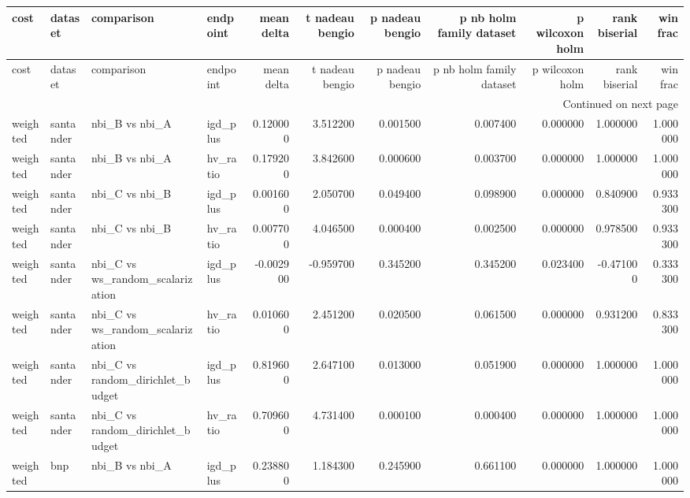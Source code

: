 \begin{landscape}
\begin{center}\label{tab:s5tests}\end{center}
\begingroup\tiny\setlength{\tabcolsep}{2.5pt}
\begin{longtable}{llllrrrrrrr}
\toprule
cost & dataset & comparison & endpoint & mean delta & t nadeau bengio & p nadeau bengio & p nb holm family dataset & p wilcoxon holm & rank biserial & win frac \\
\midrule
\endfirsthead
\toprule
cost & dataset & comparison & endpoint & mean delta & t nadeau bengio & p nadeau bengio & p nb holm family dataset & p wilcoxon holm & rank biserial & win frac \\
\midrule
\endhead
\midrule
\multicolumn{11}{r}{Continued on next page} \\
\midrule
\endfoot
\bottomrule
\endlastfoot
weighted & santander & nbi\_B vs nbi\_A & igd\_plus & 0.120000 & 3.512200 & 0.001500 & 0.007400 & 0.000000 & 1.000000 & 1.000000 \\
weighted & santander & nbi\_B vs nbi\_A & hv\_ratio & 0.179200 & 3.842600 & 0.000600 & 0.003700 & 0.000000 & 1.000000 & 1.000000 \\
weighted & santander & nbi\_C vs nbi\_B & igd\_plus & 0.001600 & 2.050700 & 0.049400 & 0.098900 & 0.000000 & 0.840900 & 0.933300 \\
weighted & santander & nbi\_C vs nbi\_B & hv\_ratio & 0.007700 & 4.046500 & 0.000400 & 0.002500 & 0.000000 & 0.978500 & 0.933300 \\
weighted & santander & nbi\_C vs ws\_random\_scalarization & igd\_plus & -0.002900 & -0.959700 & 0.345200 & 0.345200 & 0.023400 & -0.471000 & 0.333300 \\
weighted & santander & nbi\_C vs ws\_random\_scalarization & hv\_ratio & 0.010600 & 2.451200 & 0.020500 & 0.061500 & 0.000000 & 0.931200 & 0.833300 \\
weighted & santander & nbi\_C vs random\_dirichlet\_budget & igd\_plus & 0.819600 & 2.647100 & 0.013000 & 0.051900 & 0.000000 & 1.000000 & 1.000000 \\
weighted & santander & nbi\_C vs random\_dirichlet\_budget & hv\_ratio & 0.709600 & 4.731400 & 0.000100 & 0.000400 & 0.000000 & 1.000000 & 1.000000 \\
weighted & bnp & nbi\_B vs nbi\_A & igd\_plus & 0.238800 & 1.184300 & 0.245900 & 0.661100 & 0.000000 & 1.000000 & 1.000000 \\

\end{longtable}
\end{landscape}
